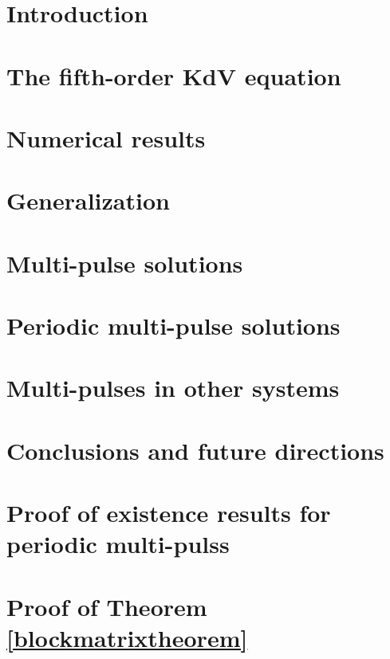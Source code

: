 \documentclass[11pt,reqno,oneside]{report}
\theoremstyle{plain}
\theoremstyle{definition}
\theoremstyle{remark}
\numberwithin{section}{chapter}
\numberwithin{equation}{chapter}
\numberwithin{figure}{chapter}
\begin{document}
\chapter{Introduction}\label{chapter:intro}


\chapter{The fifth-order KdV equation}\label{chapter:KdV5}


\chapter{Numerical results}\label{chapter:KdV5numerics}


\chapter{Generalization}\label{chapter:kdv5general}



\chapter{Multi-pulse solutions}\label{chapter:kdv5homoclinic}


\chapter{Periodic multi-pulse solutions }\label{chapter:kdv5periodic}


\chapter{Multi-pulses in other systems}\label{chapter:other}


\chapter{Conclusions and future directions}


\appendix

\chapter{Proof of existence results for periodic multi-pulss}\label{perexistproof}


\chapter{Proof of Theorem \ref{blockmatrixtheorem}}\label{blockmatrixproof}


\end{document}
